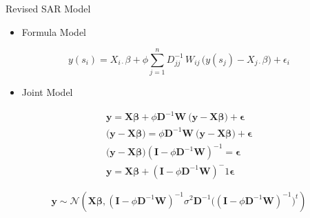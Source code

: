 \documentclass[11pt,ignorenonframetext,]{beamer}
\providecommand{\tightlist}{%
  \setlength{\itemsep}{0pt}\setlength{\parskip}{0pt}}
\begin{document}
\begin{frame}[t]{Revised SAR Model}

\begin{itemize}
\tightlist
\item
  Formula Model
\end{itemize}

\[ y(s_i) = X_{i\cdot}\beta + \phi \sum_{j=1}^n D^{-1}_{jj} \, W_{ij} \, \big(y(s_j) - X_{j\cdot}\beta\big) + \epsilon_i \]

\vspace{6mm}

\begin{itemize}
\tightlist
\item
  Joint Model
\end{itemize}

\[
\begin{aligned}
\bm{y} = \bm{X}\bm{\beta} + \phi \bm{D}^{-1} \bm{W} ~\big(\bm{y}-\bm{X}\bm\beta\big) + \bm{\epsilon} \\
\big(\bm{y}-\bm{X}\bm{\beta}\big) = \phi \bm{D}^{-1} \bm{W} ~\big(\bm{y}-\bm{X}\bm\beta\big) + \bm{\epsilon} \\
\big(\bm{y}-\bm{X}\bm{\beta}\big)(\bm{I}-\phi\bm{D}^{-1}\bm{W})^{-1} = \bm{\epsilon} \\
\bm{y} = \bm{X}\bm{\beta} + (\bm{I} - \phi \bm{D}^{-1} \bm{W})^-1 \bm\epsilon
\end{aligned}
\]

\[
\bm{y} \sim \mathcal{N}\left(\bm{X}\bm{\beta}, (\bm{I} - \phi \bm{D}^{-1} \bm{W})^{-1} \sigma^2 \bm{D}^{-1} \big((\bm{I} - \phi \bm{D}^{-1} \bm{W})^{-1}\big)^t \right)
\]

\end{frame}
\end{document}
